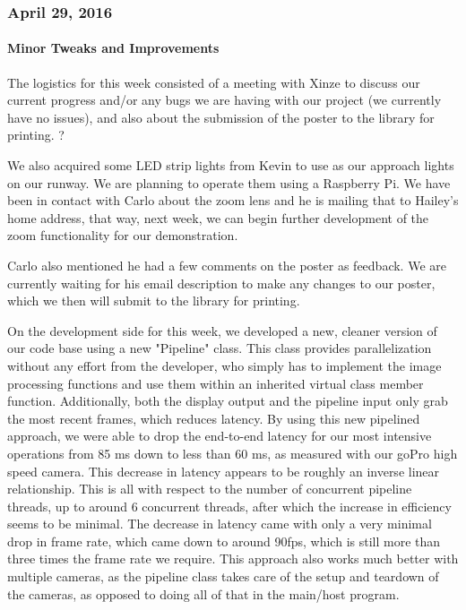 \subsubsection{April 29, 2016}
\paragraph{Minor Tweaks and Improvements}
The logistics for this week consisted of a meeting with Xinze to discuss our current progress and/or any bugs we are having with our project (we currently have no issues), and also about the submission of the poster to the library for printing. ?
\par
We also acquired some LED strip lights from Kevin to use as our approach lights on our runway. We are planning to operate them using a Raspberry Pi. We have been in contact with Carlo about the zoom lens and he is mailing that to Hailey's home address, that way, next week, we can begin further development of the zoom functionality for our demonstration. 
\par
Carlo also mentioned he had a few comments on the poster as feedback. We are currently waiting for his email description to make any changes to our poster, which we then will submit to the library for printing. 
\par
On the development side for this week, we developed a new, cleaner version of our code base using a new "Pipeline" class. This class provides parallelization without any effort from the developer, who simply has to implement the image processing functions and use them within an inherited virtual class member function. Additionally, both the display output and the pipeline input only grab the most recent frames, which reduces latency. By using this new pipelined approach, we were able to drop the end-to-end latency for our most intensive operations from 85 ms down to less than 60 ms, as measured with our goPro high speed camera. This decrease in latency appears to be roughly an inverse linear relationship. This is all with respect to the number of concurrent pipeline threads, up to around 6 concurrent threads, after which the increase in efficiency seems to be minimal. The decrease in latency came with only a very minimal drop in frame rate, which came down to around 90fps, which is still more than three times the frame rate we require. This approach also works much better with multiple cameras, as the pipeline class takes care of the setup and teardown of the cameras, as opposed to doing all of that in the main/host program.\\

